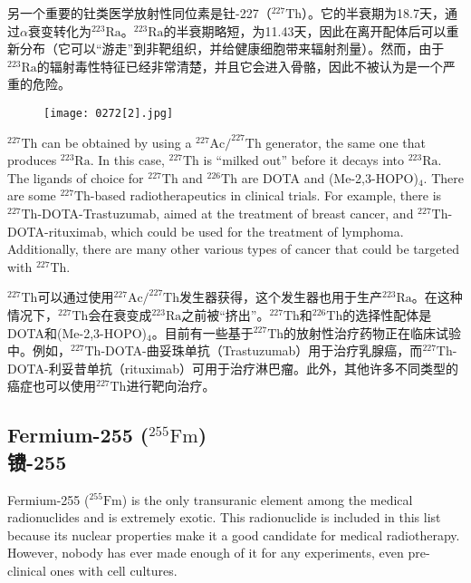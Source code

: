 \documentclass[dvipsnames, svgnames,a4paper,11pt]{article}
\begin{document}
另一个重要的钍类医学放射性同位素是钍-227（\(\mathrm{^{227}Th}\)）。它的半衰期为18.7天，通过$\alpha$衰变转化为\(\mathrm{^{223}Ra}\)。\(\mathrm{^{223}Ra}\)的半衰期略短，为11.43天，因此在离开配体后可以重新分布（它可以“游走”到非靶组织，并给健康细胞带来辐射剂量）。然而，由于\(\mathrm{^{223}Ra}\)的辐射毒性特征已经非常清楚，并且它会进入骨骼，因此不被认为是一个严重的危险。

\begin{figure}[h]
	\centering
    \texttt{[image: 0272[2].jpg]}  
     \label{fig369}
\end{figure}

\(\mathrm{^{227}Th}\) can be obtained by using a \(\mathrm{^{227}Ac/^{227}Th}\) generator, the same one that produces \(\mathrm{^{223}Ra}\). In this case, \(\mathrm{^{227}Th}\) is “milked out” before it decays into \(\mathrm{^{223}Ra}\). The ligands of choice for \(\mathrm{^{227}Th}\) and \(\mathrm{^{226}Th}\) are DOTA and (Me-2,3-HOPO)\(_{4}\). There are some \(\mathrm{^{227}Th}\)-based radiotherapeutics in clinical trials. For example, there is \(\mathrm{^{227}Th}\)-DOTA-Trastuzumab, aimed at the treatment of breast cancer, and \(\mathrm{^{227}Th}\)-DOTA-rituximab, which could be used for the treatment of lymphoma. Additionally, there are many other various types of cancer that could be targeted with \(\mathrm{^{227}Th}\).

\(\mathrm{^{227}Th}\)可以通过使用\(\mathrm{^{227}Ac/^{227}Th}\)发生器获得，这个发生器也用于生产\(\mathrm{^{223}Ra}\)。在这种情况下，\(\mathrm{^{227}Th}\)会在衰变成\(\mathrm{^{223}Ra}\)之前被“挤出”。\(\mathrm{^{227}Th}\)和\(\mathrm{^{226}Th}\)的选择性配体是DOTA和(Me-2,3-HOPO)\(_{4}\)。目前有一些基于\(\mathrm{^{227}Th}\)的放射性治疗药物正在临床试验中。例如，\(\mathrm{^{227}Th}\)-DOTA-曲妥珠单抗（Trastuzumab）用于治疗乳腺癌，而\(\mathrm{^{227}Th}\)-DOTA-利妥昔单抗（rituximab）可用于治疗淋巴瘤。此外，其他许多不同类型的癌症也可以使用\(\mathrm{^{227}Th}\)进行靶向治疗。

\subsection{Fermium-255 (\(\mathrm{^{255}Fm}\)) \\镄-255}  
Fermium-255 (\(\mathrm{^{255}Fm}\)) is the only transuranic element among the medical radionuclides and is extremely exotic. This radionuclide is included in this list because its nuclear properties make it a good candidate for medical radiotherapy. However, nobody has ever made enough of it for any experiments, even pre-clinical ones with cell cultures.  
\end{document}
